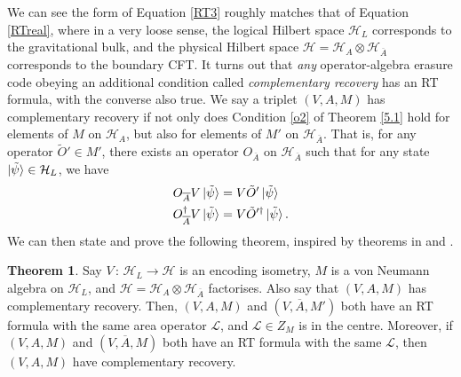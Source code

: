 \documentclass[12pt,a4paper]{report}
\numberwithin{equation}{section}
\newcommand{\ol}[1]{\overline{#1}}
\theoremstyle{definition}
\theoremstyle{theorem}
\newtheorem{theorem}{Theorem}[section]
\theoremstyle{theorem}
\theoremstyle{example}
\theoremstyle{definition}
\begin{document}
We can see the form of Equation \ref{RT3} roughly matches that of Equation \ref{RTreal}, where in a very loose sense, the logical Hilbert space $\mathcal{H}_{L}$ corresponds to the gravitational bulk, and the physical Hilbert space $\mathcal{H}=\mathcal{H}_{A}\otimes\mathcal{H}_{\ol{A}}$ corresponds to the boundary CFT. It turns out that \textit{any} operator-algebra erasure code obeying an additional condition called \textit{complementary recovery} has an RT formula, with the converse also true. We say a triplet $(V,A,M)$ has complementary recovery if not only does Condition \ref{o2} of Theorem \ref{5.1} hold for elements of $M$ on $\mathcal{H}_{A}$, but also for elements of $M'$ on $\mathcal{H}_{\ol{A}}$. That is, for any operator $\tilde{O}'\in M'$, there exists an operator $O_{\ol{A}}$ on $\mathcal{H}_{\ol{A}}$ such that for any state $\ket{\tilde{\psi}}\in\mathcal{H}_{L}$, we have
\begin{equation}
	\begin{aligned}
		O_{\ol{A}}V\ket{\tilde{\psi}}&=V\tilde{O}'\ket{\tilde{\psi}}\\
		O_{\ol{A}}^{\dagger}V\ket{\tilde{\psi}}&=V\tilde{O}'^{\dagger}\ket{\tilde{\psi}}.
	\end{aligned}
\end{equation}
We can then state and prove the following theorem, inspired by theorems in \cite{Harlow} and \cite{Pollack}.
\begin{theorem}\label{bij}
	Say $V\,:\,\mathcal{H}_{L}\to\mathcal{H}$ is an encoding isometry, $M$ is a von Neumann algebra on $\mathcal{H}_{L}$, and $\mathcal{H}=\mathcal{H}_{A}\otimes\mathcal{H}_{\ol{A}}$ factorises. Also say that $(V,A,M)$ has complementary recovery. Then, $(V,A,M)$ and $(V,\ol{A},M')$ both have an RT formula with the same area operator $\mathcal{L}$, and $\mathcal{L}\in Z_{M}$ is in the centre. Moreover, if $(V,A,M)$ and $(V,\ol{A},M)$ both have an RT formula with the same $\mathcal{L}$, then $(V,A,M)$ have complementary recovery.
\end{theorem}
\end{document}
